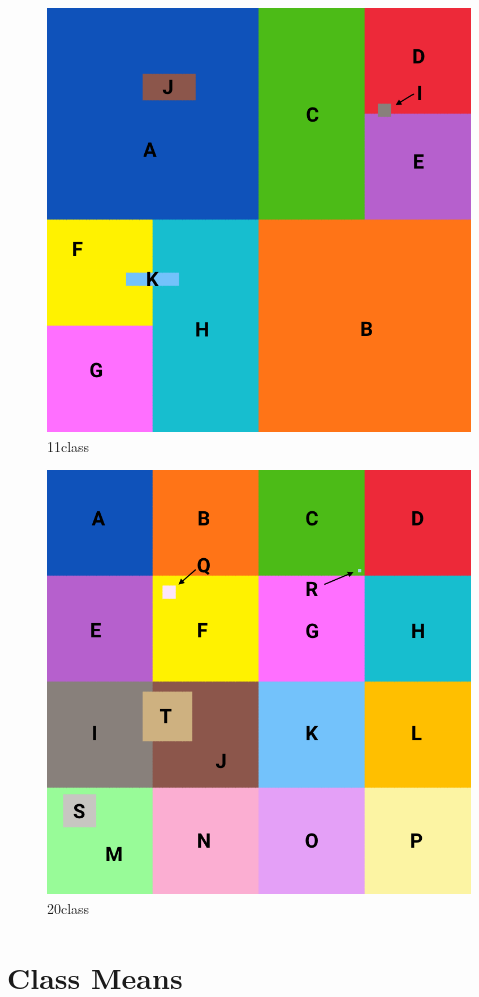 \documentclass[]{article}
\begin{document}
\begin{figure}

{\centering \includegraphics[width=0.7\linewidth]{./figs/SGRW-11class-map-annotated} 

}

\caption{11class}\label{fig:unnamed-chunk-3}
\end{figure}

\begin{figure}

{\centering \includegraphics[width=0.7\linewidth]{./figs/SGRW-20class-map-annotated} 

}

\caption{20class}\label{fig:unnamed-chunk-4}
\end{figure}

\hypertarget{class-means}{%
\section{Class Means}\label{class-means}}
\end{document}
